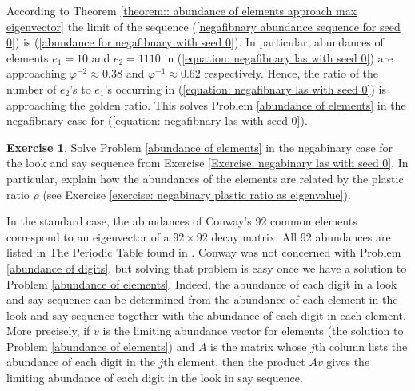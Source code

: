 \documentclass[reqno]{amsart}
\theoremstyle{definition}
\newtheorem{exercise}[theorem]{Exercise}
\begin{document}
According to Theorem \ref{theorem:: abundance of elements approach max eigenvector} the limit of the sequence (\ref{negafibnary abundance sequence for seed 0}) is (\ref{abundance for negafibnary with seed 0}). In particular, abundances of elements $e_1=10$ and $e_2=1110$ in (\ref{equation: negafibnary las with seed 0}) are approaching $\varphi^{-2}\approx 0.38$ and $\varphi^{-1}\approx 0.62$ respectively. Hence, the ratio of the number of $e_2$'s to $e_1$'s occurring in (\ref{equation: negafibnary las with seed 0}) is approaching the golden ratio. This solves Problem \ref{abundance of elements} in the negafibnary case for (\ref{equation: negafibnary las with seed 0}). 

\begin{exercise}
    Solve Problem \ref{abundance of elements} in the negabinary case for the look and say sequence from Exercise \ref{Exercise: negabinary las with seed 0}. In particular, explain how the abundances of the elements are related by the plastic ratio $\rho$ (see Exercise \ref{exercise: negabinary plastic ratio as eigenvalue}).
\end{exercise}

In the standard case, the abundances of Conway's 92 common elements correspond to an eigenvector of a $92\times 92$ decay matrix. All 92 abundances are listed in The Periodic Table found in \cite{Conway}. Conway was not concerned with Problem \ref{abundance of digits}, but solving that problem is easy once we have a solution to Problem \ref{abundance of elements}. Indeed, the abundance of each digit in a look and say sequence can be determined from the abundance of each element in the look and say sequence together with the abundance of each digit in each element. More precisely, if $v$ is the limiting abundance vector for elements (the solution to Problem \ref{abundance of elements}) and $A$ is the matrix whose $j$th column lists the abundance of each digit in the $j$th element, then the product $A v$ gives the limiting abundance of each digit in the look in say sequence.
\end{document}
